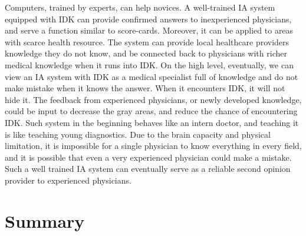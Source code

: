 \documentclass[11pt]{pnas-new}
\begin{document}
\begin{itemize}
Computers, trained by experts, can help novices. {\color{blue}A well-trained IA system equipped with IDK can provide confirmed answers to inexperienced physicians, and} serve a function
similar to score-cards{\color{blue}. Moreover, it can be applied to areas with scarce health resource. The system can provide local healthcare providers knowledge they do not know, and be connected back to physicians with richer medical knowledge when it runs into IDK.
On the high level, eventually, we can view an IA system with IDK as a medical specialist full of knowledge and do not make mistake when it knows the answer. When it encounters IDK, it will not hide it. The feedback from experienced physicians, or newly developed knowledge, could be input to decrease the gray areas, and reduce the chance of encountering IDK. Such system in the beginning behaves like an intern doctor, and teaching it is like}
teaching young diagnostics. {\color{blue}Due to the brain capacity and physical limitation, it is impossible for a single physician to know everything in every field, and it is possible that even a very experienced physician could make a mistake. Such a well trained IA system can eventually serve as a reliable second opinion provider to experienced physicians.}
\end{itemize}

\section{Summary}

% 

\end{document}
